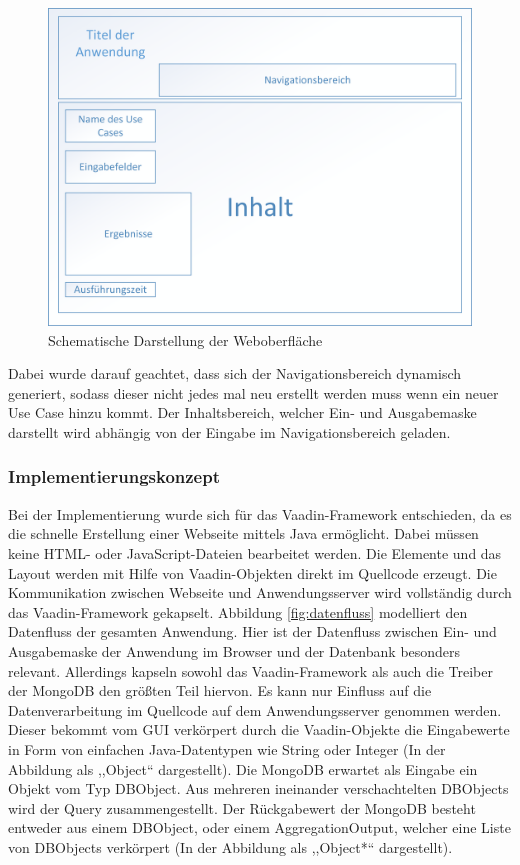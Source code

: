 \begin{figure}[H]
    \centering
    \includegraphics[scale=0.6]{images/01_oberflaechengestaltung.png}
    \caption{Schematische Darstellung der Weboberfläche}\label{fig:oberflaeche}
\end{figure}

Dabei wurde darauf geachtet, dass sich der Navigationsbereich dynamisch generiert, sodass dieser nicht jedes mal neu erstellt werden muss wenn ein neuer Use Case hinzu kommt. Der Inhaltsbereich, welcher Ein- und Ausgabemaske darstellt wird abhängig von der Eingabe im Navigationsbereich geladen. 

\subsubsection{Implementierungskonzept}
Bei der Implementierung wurde sich für das Vaadin-Framework entschieden, da es die schnelle Erstellung einer Webseite mittels Java ermöglicht. Dabei müssen keine HTML- oder JavaScript-Dateien bearbeitet werden. Die Elemente und das Layout werden mit Hilfe von Vaadin-Objekten direkt im Quellcode erzeugt. Die Kommunikation zwischen Webseite und Anwendungsserver wird vollständig durch das Vaadin-Framework gekapselt. Abbildung \ref{fig:datenfluss} modelliert den Datenfluss der gesamten Anwendung. Hier ist der Datenfluss zwischen Ein- und Ausgabemaske der Anwendung im Browser und der Datenbank besonders relevant. Allerdings kapseln sowohl das Vaadin-Framework als auch die Treiber der MongoDB den größten Teil hiervon. Es kann nur Einfluss auf die Datenverarbeitung im Quellcode auf dem Anwendungsserver genommen werden. Dieser bekommt vom GUI verkörpert durch die Vaadin-Objekte die Eingabewerte in Form von einfachen Java-Datentypen wie String oder Integer (In der Abbildung als ,,Object`` dargestellt). Die MongoDB erwartet als Eingabe ein Objekt vom Typ DBObject. Aus mehreren ineinander verschachtelten DBObjects wird der Query zusammengestellt. Der Rückgabewert der MongoDB besteht entweder aus einem DBObject, oder einem AggregationOutput, welcher eine Liste von DBObjects verkörpert (In der Abbildung als ,,Object*`` dargestellt). 

